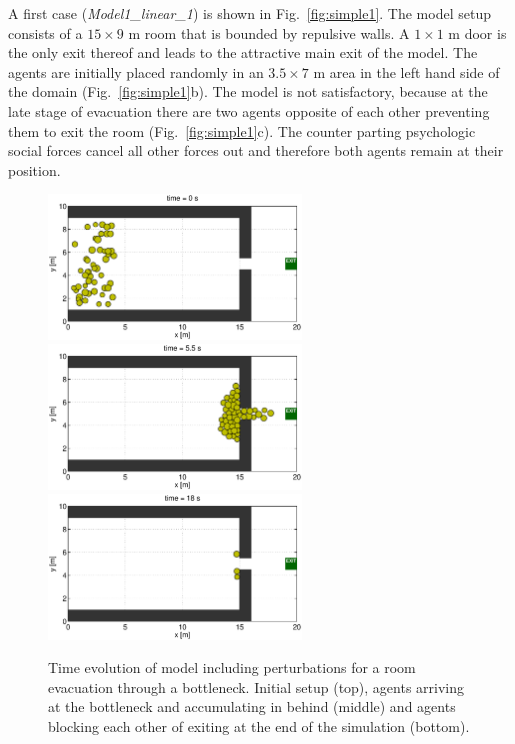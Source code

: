 \documentclass[11pt]{article}
\begin{document}
A first case ({\it Model1\_linear\_1}) is shown in Fig.~\ref{fig:simple1}. The model setup consists of a $15\times9$ m room that is bounded by repulsive walls. A $1\times1$ m door is the only exit thereof and leads to the attractive main exit of the model. The agents are initially placed randomly in an $3.5\times7$ m area in the left hand side of the domain (Fig.~\ref{fig:simple1}b). The model is not satisfactory, because at the late stage of evacuation there are two agents opposite of each other preventing them to exit the room (Fig.~\ref{fig:simple1}c). The counter parting psychologic social forces cancel all other forces out and therefore both agents remain at their position.

\begin{figure}
	\begin{center}
	\includegraphics[width=0.6\textwidth]
	{figures/Model1_direct_2b_000000.eps}
	\qquad
	\includegraphics[width=0.6\textwidth]
	{figures/Model1_direct_2b_000550.eps}
	\qquad
	\includegraphics[width=0.6\textwidth]
	{figures/Model1_direct_2b_001800.eps}
	\caption{Time evolution of model including perturbations for a room evacuation through a bottleneck. Initial setup (top), agents arriving at the bottleneck and accumulating in behind (middle) and agents blocking each other of exiting at the end of the simulation (bottom).}
	\label{fig:simple2}
	\end{center}
\end{figure}
\end{document}
